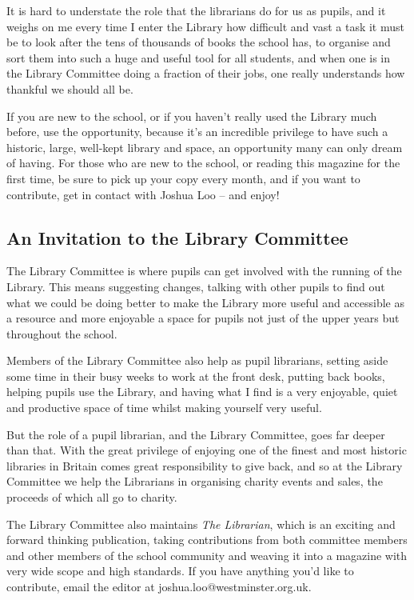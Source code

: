 \documentclass[12pt,a4paper]{report}
\begin{document}
\begin{multicols}{2}
It is hard to understate the role that the librarians do for us as pupils, and it weighs on me every time I enter the Library how difficult and vast a task it must be to look after the tens of thousands of books the school has, to organise and sort them into such a huge and useful tool for all students, and when one is in the Library Committee doing a fraction of their jobs, one really understands how thankful we should all be.

If you are new to the school, or if you haven’t really used the Library much before, use the opportunity, because it’s an incredible privilege to have such a historic, large, well-kept library and space, an opportunity many can only dream of having. For those who are new to the school, or reading this magazine for the first time, be sure to pick up your copy every month, and if you want to contribute, get in contact with Joshua Loo – and enjoy!

\subsection{An Invitation to the Library Committee}

The Library Committee is where pupils can get involved with the running of the Library. This means suggesting changes, talking with other pupils to find out what we could be doing better to make the Library more useful and accessible as a resource and more enjoyable a space for pupils not just of the upper years but throughout the school.

Members of the Library Committee also help as pupil librarians, setting aside some time in their busy weeks to work at the front desk, putting back books, helping pupils use the Library, and having what I find is a very enjoyable, quiet and productive space of time whilst making yourself very useful.

But the role of a pupil librarian, and the Library Committee, goes far deeper than that. With the great privilege of enjoying one of the finest and most historic libraries in Britain comes great responsibility to give back, and so at the Library Committee we help the Librarians in organising charity events and sales, the proceeds of which all go to charity.

The Library Committee also maintains \textit{The Librarian}, which is an exciting and forward thinking publication, taking contributions from both committee members and other members of the school community and weaving it into a magazine with very wide scope and high standards. If you have anything you’d like to contribute, email the editor at joshua.loo@westminster.org.uk.


\end{multicols}
\end{document}

